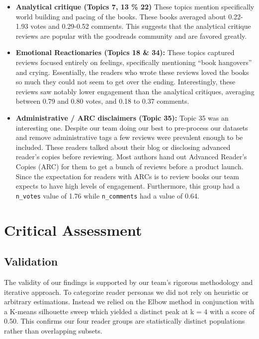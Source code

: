 \documentclass[conference]{IEEEtran}
\begin{document}
\begin{itemize}
    \item \textbf{Analytical critique (Topics 7, 13 \% 22)} These topics mention specifically world building and pacing of the books. These books averaged about 0.22-1.93 votes and 0.29-0.52 comments. This suggests that the analytical critique reviews are popular with the goodreads community and are favored greatly.
     \item \textbf{Emotional Reactionaries (Topics 18 \& 34):} These topics captured reviews focused entirely on feelings, specifically mentioning ``book hangovers'' and crying. Essentially, the readers who wrote these reviews loved the books so much they could not seem to get over the ending. Interestingly, these reviews saw notably lower engagement than the analytical critiques, averaging between 0.79 and 0.80 votes, and 0.18 to 0.37 comments.
    \item \textbf{Administrative / ARC disclaimers (Topic 35):} Topic 35 was an interesting one. Despite our team doing our best to pre-process our datasets and remove administrative tags a few reviews were prevalent enough to be included. These readers talked about their blog or disclosing advanced reader's copies before reviewing. Most authors hand out Advanced Reader's Copies (ARC) for them to get a bunch of reviews before a product launch. Since the expectation for readers with ARCs is to review books our team expects to have high levels of engagement. Furthermore, this group had a \texttt{n\_votes} value of 1.76 while \texttt{n\_comments} had a value of 0.64.

\end{itemize}




\section{Critical Assessment}





\subsection{Validation}

The validity of our findings is supported by our team's rigorous methodology and iterative approach. To categorize reader personas we did not rely on heuristic or arbitrary estimations. Instead we relied on the Elbow method in conjunction with a K-means silhouette sweep which yielded a distinct peak at k = 4 with a score of 0.50. This confirms our four reader groups are statistically distinct populations rather than overlapping subsets.
\end{document}
